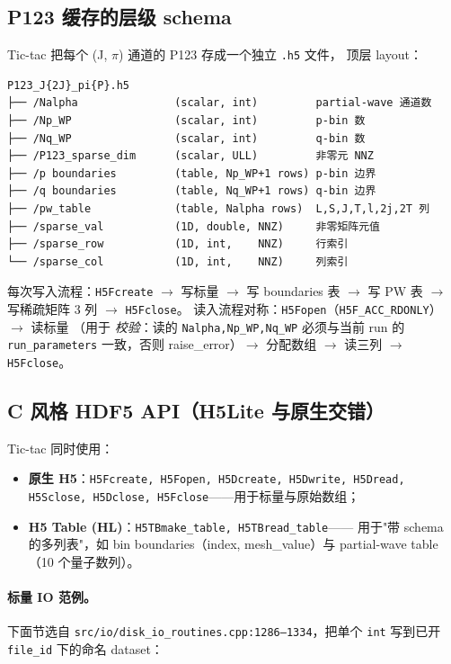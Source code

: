 \subsection{P123 缓存的层级 schema}

Tic-tac 把每个 (J, $\pi$) 通道的 P123 存成一个独立 \texttt{.h5} 文件，
顶层 layout：

\begin{verbatim}
P123_J{2J}_pi{P}.h5
├── /Nalpha               (scalar, int)         partial-wave 通道数
├── /Np_WP                (scalar, int)         p-bin 数
├── /Nq_WP                (scalar, int)         q-bin 数
├── /P123_sparse_dim      (scalar, ULL)         非零元 NNZ
├── /p boundaries         (table, Np_WP+1 rows) p-bin 边界
├── /q boundaries         (table, Nq_WP+1 rows) q-bin 边界
├── /pw_table             (table, Nalpha rows)  L,S,J,T,l,2j,2T 列
├── /sparse_val           (1D, double, NNZ)     非零矩阵元值
├── /sparse_row           (1D, int,    NNZ)     行索引
└── /sparse_col           (1D, int,    NNZ)     列索引
\end{verbatim}

每次写入流程：\texttt{H5Fcreate} $\to$ 写标量 $\to$ 写 boundaries 表 $\to$
写 PW 表 $\to$ 写稀疏矩阵 3 列 $\to$ \texttt{H5Fclose}。
读入流程对称：\texttt{H5Fopen}（\texttt{H5F\_ACC\_RDONLY}）$\to$ 读标量
（用于 \emph{校验}：读的 \texttt{Nalpha,Np\_WP,Nq\_WP} 必须与当前 run 的
\texttt{run\_parameters} 一致，否则 raise\_error）$\to$ 分配数组 $\to$
读三列 $\to$ \texttt{H5Fclose}。

\subsection{C 风格 HDF5 API（H5Lite 与原生交错）}

Tic-tac 同时使用：
\begin{itemize}
\item \textbf{原生 H5}：\texttt{H5Fcreate, H5Fopen, H5Dcreate, H5Dwrite, H5Dread,
      H5Sclose, H5Dclose, H5Fclose}——用于标量与原始数组；
\item \textbf{H5 Table (HL)}：\texttt{H5TBmake\_table, H5TBread\_table}——
      用于"带 schema 的多列表"，如 bin boundaries（index, mesh\_value）与
      partial-wave table（10 个量子数列）。
\end{itemize}

\paragraph{标量 IO 范例。}
下面节选自 \texttt{src/io/disk\_io\_routines.cpp:1286--1334}，把单个 \texttt{int}
写到已开 \texttt{file\_id} 下的命名 dataset：

